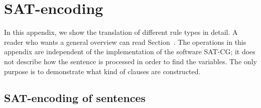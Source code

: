\def\sobre{\text{\em sobre}}
\def\una{\text{\em una}}
\def\mas{\text{\em m\'{a}s}}
\def\cientifica{\text{\em cient\'{\i}fica}}
\def\aproximacion{\text{ \em aproximaci\'{o}n}}


\def\vPrsPThree{\text{\em PrsP3}}
\def\vPrsPOne{\text{\em PrsP1}}
\def\vImpPThree{\text{\em ImpP3}}
\def\adj{{\text{\em Adj}}}
\def\adv{{\text{\em Adv}}}
\def\n{\text{\em N}}
\def\pr{{\text{\em Pr}}}
\def\prn{{\text{\em Prn}}}
\def\det{{\text{\em Det}}}
\def\notDet{{\neg \text{\em Det}}}
\def\any{{\text{Any}}}


\def\sobrePr{\sobre_\pr}
\def\sobreN{\sobre_\n}

\def\unaNotDet{\una_\notDet}
\def\unaAny{\una_\any}
\def\unaPrn{\una_\prn}
\def\unaDet{\una_\det}
\def\unaPrsPThree{\una_\vPrsPThree}
\def\unaPrsPOne{\una_\vPrsPOne}
\def\unaImp{\una_\vImpPThree}
\def\aproximacionN{\aproximacion_\n}
\def\masAdv{\mas_\adv}
\def\masAdj{\mas_\adj}
\def\cientificaAdj{\cientifica_\adj}
\def\cientificaN{\cientifica_\n}

\def\cgrule#1{\noindent {\sc \bf #1 }}





\appendix
\chapter{SAT-encoding}

In this appendix, we show the translation of different rule types in detail. 
A reader who wants a general overview can read Section~.
The operations in this appendix are independent of the implementation of the software SAT-CG; it does not describe how the sentence is processed in order to find the variables.
The only purpose is to demonstrate what kind of clauses are constructed.

\section{SAT-encoding of sentences}


